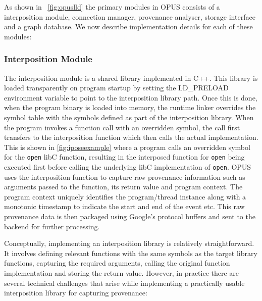 \documentclass[withindex,glossary]{cam-thesis}
\begin{document}
As shown in ~\ref{fig:opuslld} the primary modules in OPUS consists of a interposition module, connection manager, provenance analyser, storage interface and a graph database.
We now describe implementation details for each of these modules:

\subsubsection{Interposition Module}
The interposition module is a shared library implemented in C++.
This library is loaded transparently on program startup by setting the LD\_PRELOAD environment variable to point to the interposition library path.
Once this is done, when the program binary is loaded into memory, the runtime linker overrides the symbol table with the symbols defined as part of the interposition library.
When the program invokes a function call with an overridden symbol, the call first transfers to the interposition function which then calls the actual implementation. 
This is shown in \ref{fig:iposeexample} where a program calls an overridden symbol for the \texttt{open} libC function, resulting in the interposed function for \texttt{open} being executed first before calling the underlying libC implementation of \texttt{open}.
OPUS uses the interposition function to capture raw provenance information such as arguments passed to the function, its return value and program context.
The program context uniquely identifies the program/thread instance along with a monotonic timestamp to indicate the start and end of the event etc.
This raw provenance data is then packaged using Google's protocol buffers and sent to the backend for further processing.

Conceptually, implementing an interposition library is relatively straightforward.
It involves defining relevant functions with the same symbols as the target library functions, capturing the required arguments, calling the original function implementation and storing the return value.
However, in practice there are several technical challenges that arise while implementing a practically usable interposition library for capturing provenance:
\end{document}
